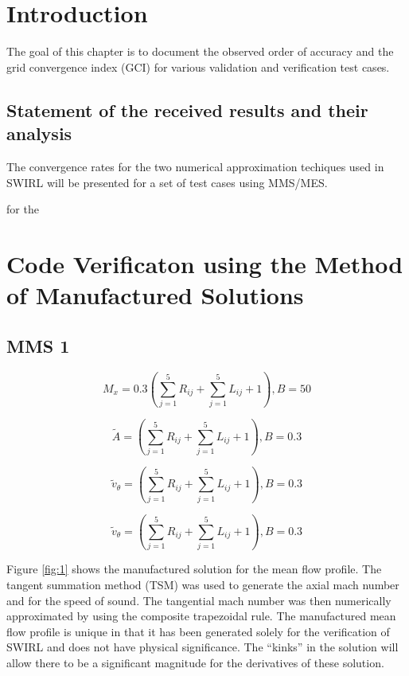 \section{Introduction}
The goal of this chapter is to document the observed order of accuracy and the 
grid convergence index (GCI) for various validation and verification test cases.

\subsection{Statement of the received results and their analysis}
The convergence rates for the two numerical approximation techiques used in
SWIRL will be presented for a set of test cases using MMS/MES. 


for the 
\section{Code Verificaton using the Method of Manufactured Solutions}
\subsection{MMS 1}

\begin{equation}
    M_x = 0.3 \left(
    \sum_{j=1}^5 R_{ij} +
    \sum_{j=1}^5 L_{ij} + 1
    \right) , B = 50
    \label{eqn:MMS_M_x}
\end{equation}

\begin{equation}
    \tilde{A} = \left(
    \sum_{j=1}^5 R_{ij} +
    \sum_{j=1}^5 L_{ij} + 1
    \right) , B = 0.3
    \label{eqn:MMS_M_x}
\end{equation}


\begin{equation}
    \tilde{v}_{\theta} = \left(
    \sum_{j=1}^5 R_{ij} +
    \sum_{j=1}^5 L_{ij} + 1
    \right) , B = 0.3
    \label{eqn:MMS_M_x}
\end{equation}


\begin{equation}
    \tilde{v}_{\theta} = \left(
    \sum_{j=1}^5 R_{ij} +
    \sum_{j=1}^5 L_{ij} + 1
    \right) , B = 0.3
    \label{eqn:MMS_M_x}
\end{equation}

Figure \ref{fig:1} shows the manufactured solution for the mean flow profile. 
The tangent summation method (TSM) was used to generate the axial mach number and 
for the speed of sound.   The tangential mach number was then numerically approximated by 
using the composite trapezoidal rule. The manufactured mean flow profile 
is unique in that it has been generated solely for the verification of SWIRL 
and does not have physical significance. The ``kinks'' in the solution will allow
there to be a significant magnitude for the derivatives of these solution. 

